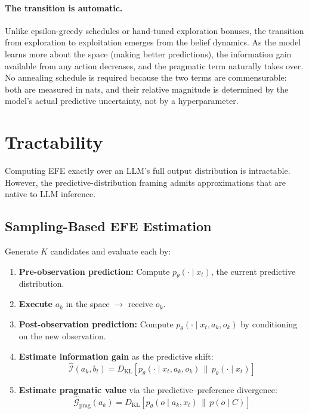\documentclass[11pt]{article}
\newcommand{\EFE}{\mathcal{G}}
\newcommand{\KL}[2]{D_{\mathrm{KL}}\!\left[#1 \,\|\, #2\right]}
\begin{document}
\paragraph{The transition is automatic.}
Unlike epsilon-greedy schedules or hand-tuned exploration bonuses, the transition from exploration to exploitation emerges from the belief dynamics. As the model learns more about the space (making better predictions), the information gain available from any action decreases, and the pragmatic term naturally takes over. No annealing schedule is required because the two terms are commensurable: both are measured in nats, and their relative magnitude is determined by the model's actual predictive uncertainty, not by a hyperparameter.


\section{Tractability}
\label{sec:tractability}

Computing EFE exactly over an LLM's full output distribution is intractable. However, the predictive-distribution framing admits approximations that are native to LLM inference.

\subsection{Sampling-Based EFE Estimation}

Generate $K$ candidates and evaluate each by:
\begin{enumerate}
    \item \textbf{Pre-observation prediction:} Compute $p_{\theta}(\cdot \mid x_t)$, the current predictive distribution.
    \item \textbf{Execute} $a_k$ in the space $\rightarrow$ receive $o_k$.
    \item \textbf{Post-observation prediction:} Compute $p_\theta(\cdot \mid x_t, a_k, o_k)$ by conditioning on the new observation.
    \item \textbf{Estimate information gain} as the predictive shift:
    \begin{equation}
    \label{eq:info-gain-approx}
    \hat{\mathcal{I}}(a_k, b_t) = \KL{p_\theta(\cdot \mid x_t, a_k, o_k)}{p_\theta(\cdot \mid x_t)}
    \end{equation}
    \item \textbf{Estimate pragmatic value} via the predictive--preference divergence:
    \begin{equation}
    \hat{\EFE}_{\mathrm{prag}}(a_k) = \KL{p_\theta(o \mid a_k, x_t)}{p(o \mid C)}
    \end{equation}
\end{enumerate}
\end{document}
